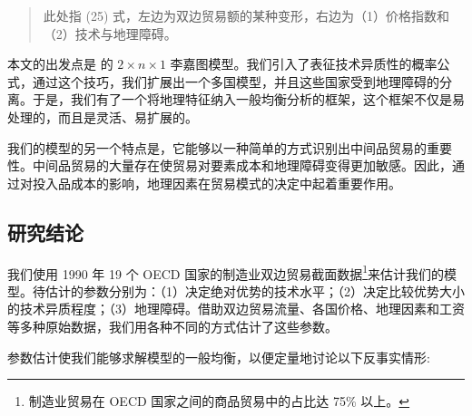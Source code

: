 \documentclass[
]{article}
\begin{document}
\begin{quote}
此处指 (25) 式，左边为双边贸易额的某种变形，右边为（1）价格指数和（2）技术与地理障碍。
\end{quote}

本文的出发点是 \citet{DFS1977} 的 \(2 \times n \times 1\)
李嘉图模型。我们引入了表征技术异质性的概率公式，通过这个技巧，我们扩展出一个多国模型，并且这些国家受到地理障碍的分离。于是，我们有了一个将地理特征纳入一般均衡分析的框架，这个框架不仅是易处理的，而且是灵活、易扩展的。

我们的模型的另一个特点是，它能够以一种简单的方式识别出中间品贸易的重要性。中间品贸易的大量存在使贸易对要素成本和地理障碍变得更加敏感。因此，通过对投入品成本的影响，地理因素在贸易模式的决定中起着重要作用。

\hypertarget{ux7814ux7a76ux7ed3ux8bba}{%
\subsection{研究结论}\label{ux7814ux7a76ux7ed3ux8bba}}

我们使用 1990 年 19 个 OECD
国家的制造业双边贸易截面数据\footnote{制造业贸易在 OECD 国家之间的商品贸易中的占比达 75\% 以上。}来估计我们的模型。待估计的参数分别为：（1）决定绝对优势的技术水平；（2）决定比较优势大小的技术异质程度；（3）地理障碍。借助双边贸易流量、各国价格、地理因素和工资等多种原始数据，我们用各种不同的方式估计了这些参数。

参数估计使我们能够求解模型的一般均衡，以便定量地讨论以下反事实情形:
\end{document}
